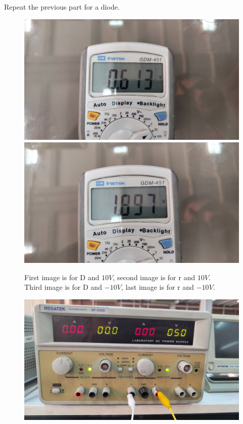 \documentclass[11pt]{article}
\newcommand{\PicScale}{0.2}
\begin{document}
\begin{question}
\begin{subquestion}{Repeat the previous part for a diode.}
{\begin{figure}[H]
                \includegraphics[scale=0.08,angle=0]{Fig/28.jpeg}
                \includegraphics[scale=0.08,angle=0]{Fig/29.jpeg}
                \caption{First image is for D and $10V$, second image is for r and $10V$. \\
                    \hspace*{14mm} Third image is for D and $-10V$, last image is for r and $-10V$.}
            \end{figure}
            \begin{figure}[H]
                \centering
                \includegraphics[scale=\PicScale,angle=0]{Fig/30.jpeg}

\end{figure}}
\end{subquestion}
\end{question}
\end{document}
